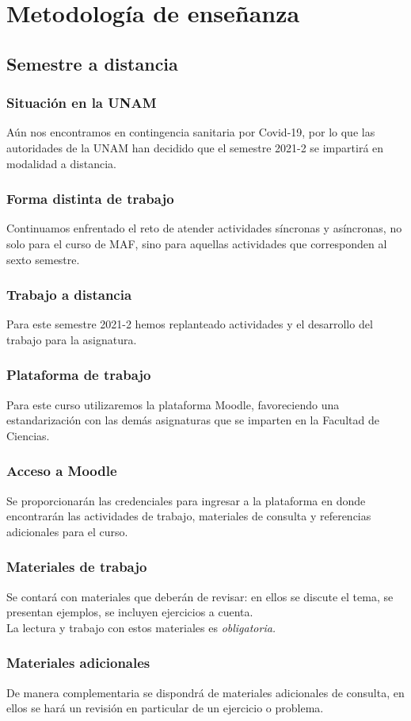 \section{Metodología de enseñanza}
\subsection{Semestre a distancia}
\begin{frame}
\frametitle{Situación en la UNAM}
Aún nos encontramos en contingencia sanitaria por Covid-19, por lo que las autoridades de la UNAM han decidido que el semestre 2021-2 se impartirá en modalidad a distancia.
\end{frame}
\begin{frame}
\frametitle{Forma distinta de trabajo}
Continuamos enfrentado el reto de atender actividades síncronas y asíncronas, no solo para el curso de MAF, sino para aquellas actividades que corresponden al sexto semestre.
\end{frame}
\begin{frame}
\frametitle{Trabajo a distancia}
Para este semestre 2021-2 hemos replanteado actividades y el desarrollo del trabajo para la asignatura.
\end{frame}
\begin{frame}
\frametitle{Plataforma de trabajo}
Para este curso utilizaremos la plataforma Moodle, favoreciendo una estandarización con las demás asignaturas que se imparten en la Facultad de Ciencias.
\end{frame}
\begin{frame}
\frametitle{Acceso a Moodle}
Se proporcionarán las credenciales para ingresar a la plataforma en donde encontrarán las actividades de trabajo, materiales de consulta y referencias adicionales para el curso.
\end{frame}
\begin{frame}
\frametitle{Materiales de trabajo}
Se contará con materiales que deberán de revisar: en ellos se discute el tema, se presentan ejemplos, se incluyen ejercicios a cuenta.
\\
\bigskip
La lectura y trabajo con estos materiales es \emph{obligatoria.}
\end{frame}
\begin{frame}
\frametitle{Materiales adicionales}
De manera complementaria se dispondrá de materiales adicionales de consulta, en ellos se hará un revisión en particular de un ejercicio o problema.
\end{frame}
